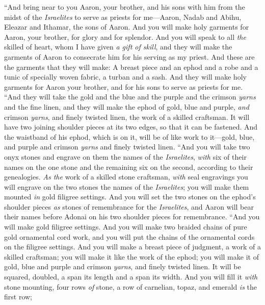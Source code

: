 \begin{biblechapter} %
 “And bring near to you Aaron, your brother, and his sons with him from the midst of the \textit{Israelites} to serve as priests for me—Aaron, Nadab and Abihu, Eleazar and Ithamar, the sons of Aaron.
\verse And you will make holy garments for Aaron, your brother, for glory and for splendor.
\verse And you will speak to all \textit{the} skilled of heart, whom I have given \textit{a gift of skill}, and they will make the garments of Aaron to consecrate him for his serving as my priest.
\verse And these are the garments that they will make: A breast piece and an ephod and a robe and a tunic of specially woven fabric, a turban and a sash. And they will make holy garments for Aaron your brother, and for his sons to serve as priests for me.
\verse “And they will take the gold and the blue and the purple and the crimson \textit{yarns} and the fine linen,
\verse and they will make the ephod of gold, blue and purple, \textit{and} crimson \textit{yarns}, and finely twisted linen, the work of a skilled craftsman.
\verse It will have two joining shoulder pieces at its two edges, so that it can be fastened.
\verse And the waistband of his ephod, which is on it, will be of like work to it—gold, blue, and purple and crimson \textit{yarns} and finely twisted linen.
\verse “And you will take two onyx stones and engrave on them the names of the \textit{Israelites},
\verse \textit{with} six of their names on the one stone and the remaining six on the second, according to their genealogies.
\verse \textit{As the} work of a skilled stone craftsman, \textit{with} seal engravings you will engrave on the two stones the names of the \textit{Israelites}; you will make them mounted \textit{in} gold filigree settings.
\verse And you will set the two stones on the ephod’s shoulder pieces \textit{as} stones of remembrance for the \textit{Israelites}, and Aaron will bear their names before Adonai on his two shoulder pieces for remembrance.
\verse “And you will make gold filigree settings.
\verse And you will make two braided chains of pure gold ornamental cord work, and you will put the chains of the ornamental cords on the filigree settings.
\verse And you will make a breast piece of judgment, a work of a skilled craftsman; you will make it like the work of the ephod; you will make it of gold, blue and purple and crimson \textit{yarns}, and finely twisted linen.
\verse It will be squared, doubled, a span its length and a span its width.
\verse And you will fill it \textit{with} stone mounting, four rows \textit{of} stone, a row of carnelian, topaz, and emerald \textit{is} the first row;

\end{biblechapter}

